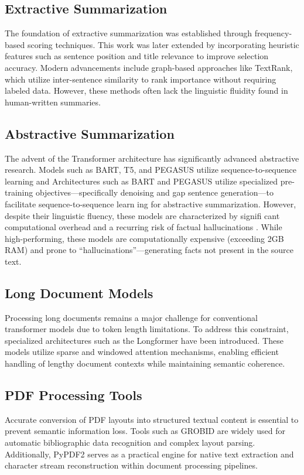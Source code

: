 \documentclass[conference]{IEEEtran}
\begin{document}
\subsection{Extractive Summarization}
The foundation of extractive summarization was established through frequency-based scoring techniques\cite{8, 9}. This work was later extended by incorporating heuristic features such as sentence position and title relevance to improve selection accuracy\cite{8}. Modern advancements include graph-based approaches like TextRank, which utilize inter-sentence similarity to rank importance without requiring labeled data\cite{7}. However, these methods often lack the linguistic fluidity found in human-written summaries\cite{7, 8, 20}.


\subsection{Abstractive Summarization}
The advent of the Transformer architecture\cite{12} has significantly advanced abstractive research. Models such as BART, T5, and PEGASUS utilize sequence-to-sequence learning and Architectures such as BART and PEGASUS utilize specialized pre-training objectives—specifically denoising and gap
sentence generation—to facilitate sequence-to-sequence learn
ing for abstractive summarization. However, despite their
linguistic fluency, these models are characterized by signifi
cant computational overhead and a recurring risk of factual
hallucinations \cite{2, 3, 4, 24}. While high-performing, these models are computationally expensive (exceeding 2GB RAM)\cite{3, 6} and prone to ``hallucinations''—generating facts not present in the source text\cite{14}.


\subsection{Long Document Models}

Processing long documents remains a major challenge for conventional transformer models due to token length limitations\cite{1, 5}. To address this constraint, specialized architectures such as the Longformer have been introduced\cite{5}. These models utilize sparse and windowed attention mechanisms, enabling efficient handling of lengthy document contexts while maintaining semantic coherence\cite{5, 12}.

\subsection{PDF Processing Tools}
Accurate conversion of PDF layouts into structured textual content is essential to prevent semantic information loss\cite{23}. Tools such as GROBID are widely used for automatic bibliographic data recognition and complex layout parsing\cite{10, 23}. Additionally, PyPDF2 serves as a practical engine for native text extraction and character stream reconstruction within document processing pipelines\cite{3, 4, 13,17}.
\end{document}
